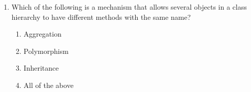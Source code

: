 \documentclass[12pt]{article}
\newcommand{\answeritem}{\global\answertrue\item}
\newcommand{\perhapsanswer}{%
  \ifanswer
    $\blacksquare$ \global\answerfalse
  \else
    $\square$ \global\answerfalse
  \fi
}
\newif\ifanswer
\begin{document}
\begin{enumerate}
    \item Which of the following is a mechanism that allows several objects in a class hierarchy to have different methods with the same name?
    \begin{enumerate}[start=1,align=left,label={\protect\perhapsanswer(\alph*)}]
      \item Aggregation
      \answeritem Polymorphism
      \item Inheritance
      \item All of the above
    \end{enumerate}

  \end{enumerate}
\end{document}
